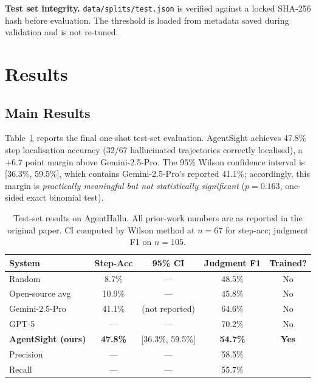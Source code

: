 \documentclass[11pt]{article}
\begin{document}
\textbf{Test set integrity.} \texttt{data/splits/test.json} is verified against a locked SHA-256 hash before evaluation. The threshold is loaded from metadata saved during validation and is not re-tuned.

\section{Results}

\subsection{Main Results}

Table~\ref{tab:main} reports the final one-shot test-set evaluation. AgentSight achieves 47.8\% step localisation accuracy (32/67 hallucinated trajectories correctly localised), a $+$6.7 point margin above Gemini-2.5-Pro. The 95\% Wilson confidence interval is [36.3\%, 59.5\%], which contains Gemini-2.5-Pro's reported 41.1\%; accordingly, this margin is \emph{practically meaningful but not statistically significant} ($p{=}0.163$, one-sided exact binomial test).

\begin{table}[h]
\centering
\caption{Test-set results on AgentHallu. All prior-work numbers are as reported in the original paper. CI computed by Wilson method at $n{=}67$ for step-acc; judgment F1 on $n{=}105$.}
\label{tab:main}
\begin{tabular}{lcccc}
\toprule
\textbf{System} & \textbf{Step-Acc} & \textbf{95\% CI} & \textbf{Judgment F1} & \textbf{Trained?} \\
\midrule
Random              & 8.7\%  & ---             & 48.5\% & No \\
Open-source avg     & 10.9\% & ---             & 45.8\% & No \\
Gemini-2.5-Pro      & 41.1\% & (not reported)  & 64.6\% & No \\
GPT-5               & ---    & ---             & 70.2\% & No \\
\midrule
\textbf{AgentSight (ours)} & \textbf{47.8\%} & {[36.3\%, 59.5\%]} & \textbf{54.7\%} & \textbf{Yes} \\
\quad Precision     & ---    & ---             & 58.5\% & \\
\quad Recall        & ---    & ---             & 55.7\% & \\
\bottomrule
\end{tabular}
\end{table}
\end{document}
